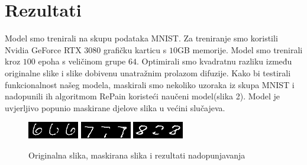 \documentclass[10pt, a4paper, croatian]{article}
\begin{document}
\section{Rezultati}
Model smo trenirali na skupu podataka MNIST. Za treniranje smo koristili Nvidia GeForce RTX 3080 grafičku karticu s $10$GB memorije.
Model smo trenirali kroz $100$ epoha s veličinom grupe $64$. Optimirali smo kvadratnu razliku između originalne slike i slike dobivenu unatražnim prolazom difuzije.
Kako bi testirali funkcionalnost našeg modela, maskirali smo nekoliko uzoraka iz skupa MNIST i nadopunili ih algoritmom RePain koristeći naučeni model(slika 2).
Model je uvjerljivo popunio maskirane djelove slika u većini slučajeva.
\begin{figure}
	\begin{center}
	\includegraphics[width=\columnwidth]{../repaint_output/inpainted_combined_6.png}
	\includegraphics[width=\columnwidth]{../repaint_output/inpainted_combined_7.png}
	\includegraphics[width=\columnwidth]{../repaint_output/inpainted_combined_8.png}
	\caption{Originalna slika, maskirana slika i rezultati nadopunjavanja}
	\label{fig:figure3}
	\end{center}
\end{figure}
\end{document}
